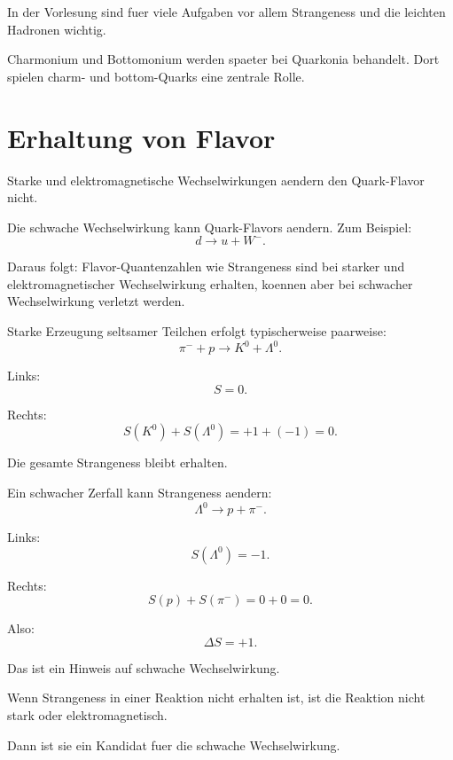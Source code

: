 \begin{conceptbox}
In der Vorlesung sind fuer viele Aufgaben vor allem Strangeness und die leichten
Hadronen wichtig.

Charmonium und Bottomonium werden spaeter bei Quarkonia behandelt.
Dort spielen charm- und bottom-Quarks eine zentrale Rolle.
\end{conceptbox}

\section{Erhaltung von Flavor}

\begin{conceptbox}
Starke und elektromagnetische Wechselwirkungen aendern den Quark-Flavor nicht.

Die schwache Wechselwirkung kann Quark-Flavors aendern.
Zum Beispiel:
\[
    d \rightarrow u + W^-.
\]
\end{conceptbox}

\begin{notebox}
Daraus folgt:
Flavor-Quantenzahlen wie Strangeness sind bei starker und elektromagnetischer
Wechselwirkung erhalten, koennen aber bei schwacher Wechselwirkung verletzt werden.
\end{notebox}

\begin{examplebox}
Starke Erzeugung seltsamer Teilchen erfolgt typischerweise paarweise:
\[
    \pi^- + p \rightarrow K^0 + \Lambda^0.
\]

Links:
\[
    S=0.
\]

Rechts:
\[
    S(K^0)+S(\Lambda^0)
    =
    +1 + (-1)
    =
    0.
\]

Die gesamte Strangeness bleibt erhalten.
\end{examplebox}

\begin{examplebox}
Ein schwacher Zerfall kann Strangeness aendern:
\[
    \Lambda^0 \rightarrow p + \pi^-.
\]

Links:
\[
    S(\Lambda^0)=-1.
\]

Rechts:
\[
    S(p)+S(\pi^-)=0+0=0.
\]

Also:
\[
    \Delta S = +1.
\]

Das ist ein Hinweis auf schwache Wechselwirkung.
\end{examplebox}

\begin{examtipbox}
Wenn Strangeness in einer Reaktion nicht erhalten ist, ist die Reaktion nicht stark
oder elektromagnetisch.

Dann ist sie ein Kandidat fuer die schwache Wechselwirkung.
\end{examtipbox}

